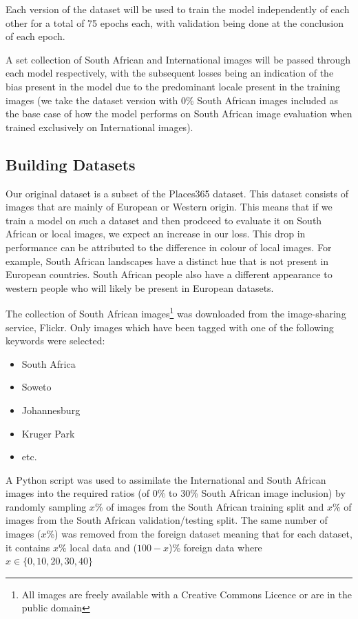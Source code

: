 \documentclass[conference]{IEEEtran}
\begin{document}
Each version of the dataset will be used to train the model independently of each other for a total of 75 epochs each, with validation being done at the conclusion of each epoch. 

A set collection of South African and International images will be passed through each model respectively, with the subsequent losses being an indication of the bias present in the model due to the predominant locale present in the training images (we take the dataset version with 0\% South African images included as the base case of how the model performs on South African image evaluation when trained exclusively on International images).

\subsection{Building Datasets}

Our original dataset is a subset of the Places365 dataset. This dataset consists of images that are mainly of European or Western origin. This means that if we train a model on such a dataset and then prodceed to evaluate it on South African or local images, we expect an increase in our loss. This drop in performance can be attributed to the difference in colour of local images. For example, South African landscapes have a distinct hue that is not present in European countries. South African people also have a different appearance to western people who will likely be present in European datasets.

The collection of South African images\footnote{All images are freely available with a Creative Commons Licence or are in the public domain} was downloaded from the image-sharing service, Flickr. Only images which have been tagged with one of the following keywords were selected:

\begin{itemize}
	\item South Africa
	\item Soweto
	\item Johannesburg
	\item Kruger Park
	\item etc.
\end{itemize}

A Python script was used to assimilate the International and South African images into the required ratios (of 0\% to 30\% South African image inclusion) by randomly sampling $x$\% of images from the South African training split and $x$\% of images from the South African validation/testing split. The same number of images ($x$\%) was removed from the foreign dataset meaning that for each dataset, it contains $x$\% local data and ($100 - x$)\% foreign data where $x\in\{0, 10, 20, 30, 40\}$
\end{document}
